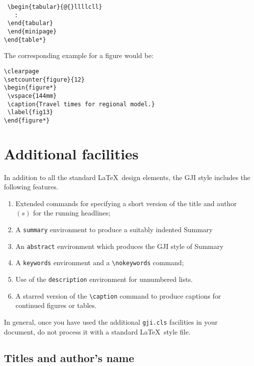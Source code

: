 \begin{enumerate}
\begin{verbatim}
 \begin{tabular}{@{}llllcll}
   :
 \end{tabular}
 \end{minipage}
\end{table*}
\end{verbatim}
The corresponding example for a figure would be:
\begin{verbatim}
\clearpage
\setcounter{figure}{12}
\begin{figure*}
 \vspace{144mm}
 \caption{Travel times for regional model.}
 \label{fig13}
\end{figure*}
\end{verbatim}
\end{enumerate}


\section{Additional facilities}

In addition to all the standard \LaTeX\ design elements, the GJI style
includes the following features.
\begin{enumerate}
  \item Extended commands for specifying a short version of the title and
        author$(s)$ for the running headlines;
  \item A \verb"summary" environment to produce a suitably indented
        Summary
  \item An \verb"abstract" environment which produces the GJI style of
        Summary
  \item A \verb"keywords" environment and a \verb"\nokeywords" command;
  \item Use of the \verb"description" environment for unnumbered lists.
  \item A starred version of the \verb"\caption" command to produce
        captions for continued figures or tables.
 \end{enumerate}
 In general, once you have used the additional \verb"gji.cls" facilities
in your document, do not process it with a standard \LaTeX\ style file.

\subsection{Titles and author's name}

